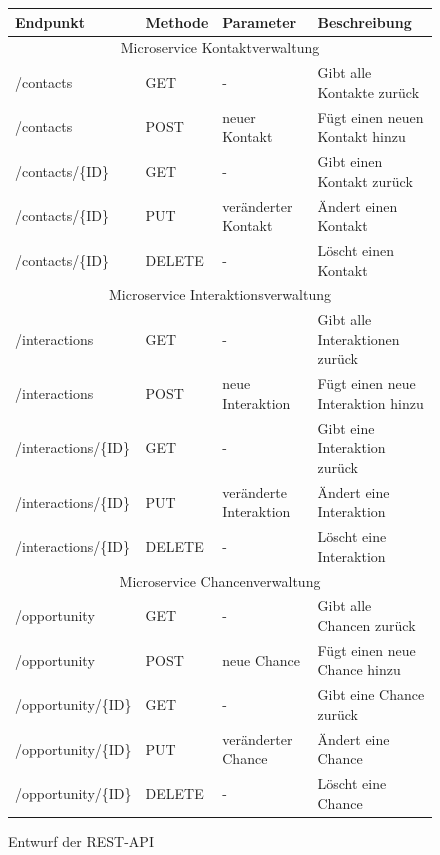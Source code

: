 \begin{figure}[H] 
\centering
    \begin{tabular}[H]{|l|l|l|l|}
    		\hline
        \rowcolor{lightgray!50}
        Endpunkt & Methode & Parameter & Beschreibung \\
        \hline
        \hline
        \multicolumn{4}{|c|}{Microservice Kontaktverwaltung} \\
        \hline
        /contacts & GET & - & Gibt alle Kontakte zurück \\
        \hline
        /contacts & POST & neuer Kontakt & Fügt einen neuen Kontakt hinzu \\
        \hline
        /contacts/\{ID\} & GET & - & Gibt einen Kontakt zurück \\
        \hline
        /contacts/\{ID\} & PUT & veränderter Kontakt & Ändert einen Kontakt \\
        \hline
        /contacts/\{ID\} & DELETE & - & Löscht einen Kontakt \\
        \hline
        \hline
        \multicolumn{4}{|c|}{Microservice Interaktionsverwaltung} \\
        \hline
        /interactions & GET & - & Gibt alle Interaktionen zurück \\
        \hline
        /interactions & POST & neue Interaktion & Fügt einen neue Interaktion hinzu \\
        \hline
        /interactions/\{ID\} & GET & - & Gibt eine Interaktion zurück \\
        \hline
        /interactions/\{ID\} & PUT & veränderte Interaktion & Ändert eine Interaktion \\
        \hline
        /interactions/\{ID\} & DELETE & - & Löscht eine Interaktion \\
        \hline
        \hline
        \multicolumn{4}{|c|}{Microservice Chancenverwaltung} \\
        \hline
        /opportunity & GET & - & Gibt alle Chancen zurück \\
        \hline
        /opportunity & POST & neue Chance & Fügt einen neue Chance hinzu \\
        \hline
        /opportunity/\{ID\} & GET & - & Gibt eine Chance zurück \\
        \hline
        /opportunity/\{ID\} & PUT & veränderter Chance & Ändert eine Chance \\
        \hline
        /opportunity/\{ID\} & DELETE & - & Löscht eine Chance \\
        \hline
    \end{tabular}
    \caption{Entwurf der REST-API}
\end{figure}

